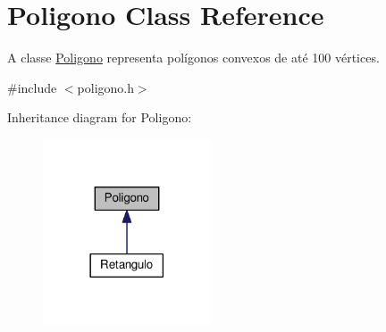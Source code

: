 \hypertarget{class_poligono}{}\section{Poligono Class Reference}
\label{class_poligono}


A classe \hyperlink{class_poligono}{Poligono} representa polígonos convexos de até 100 vértices.  




{\ttfamily \#include $<$poligono.\+h$>$}



Inheritance diagram for Poligono\+:\nopagebreak
\begin{figure}[H]
\begin{center}
\leavevmode
\includegraphics[width=141pt]{class_poligono__inherit__graph}
\end{center}
\end{figure}
